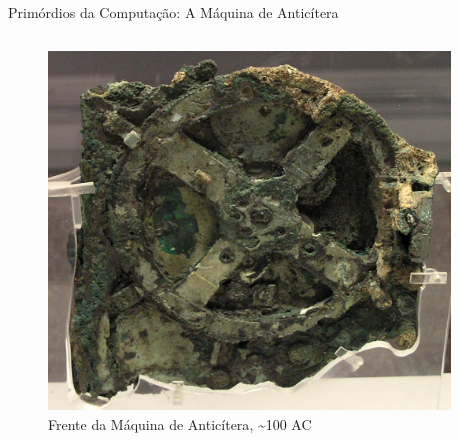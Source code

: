 \documentclass[10pt, compress, aspectratio=169, xcolor={table,usenames,dvipsnames}]{beamer}
\begin{document}
\begin{frame}[label={sec:orga764b25}]{Primórdios da Computação: A Máquina de Anticítera}
\begin{columns}
\begin{column}{0.5\columnwidth}
\begin{figure}[htbp]
\centering
\includegraphics[width=.9\columnwidth]{../../../img/anticitera_frente.jpg}
\caption{Frente da \alert{Máquina de Anticítera}, \textasciitilde{}100 AC}
\end{figure}
\end{column}
\begin{column}{0.5\columnwidth}


\end{column}
\end{columns}
\end{frame}
\end{document}
